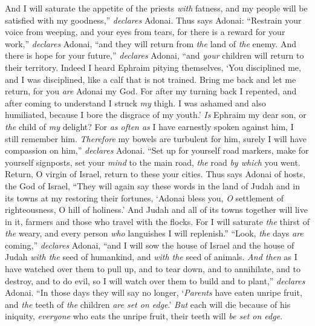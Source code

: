 \begin{biblechapter}
\verse And I will saturate the appetite of the priests \textit{with} fatness, 
and my people will be satisfied with my goodness,” \textit{declares} Adonai.
\verse Thus says Adonai:
\verse “Restrain your voice from weeping, 
and your eyes from tears, 
for there is a reward for your work,” \textit{declares} Adonai, 
“and they will return from \textit{the} land of \textit{the} enemy.
\verse And there is hope for your future,” \textit{declares} Adonai, 
“and \textit{your} children will return to their territory.
\verse Indeed I heard Ephraim pitying themselves, 
‘You disciplined me, and I was disciplined, 
like a calf that is not trained. 
Bring me back and let me return, 
for you \textit{are} Adonai my God.
\verse For after my turning back I repented, 
and after coming to understand I struck \textit{my} thigh. 
I was ashamed and also humiliated, 
because I bore the disgrace of my youth.’
\verse \textit{Is} Ephraim my dear son, 
or \textit{the} child of \textit{my} delight? 
For \textit{as often as} I have earnestly spoken against him, 
I still remember him. 
\textit{Therefore} my bowels are turbulent for him, 
surely I will have compassion on him,” \textit{declares} Adonai.
\verse “Set up for yourself road markers, 
make for yourself signposts, 
set your \textit{mind} to the main road, 
\textit{the} road \textit{by which} you went. 
Return, O virgin of Israel, 
return to these your cities.
\verse Thus says Adonai of hosts, the God of Israel, “They will again say these words in the land of Judah and in its towns at my restoring their fortunes,
\verse ‘Adonai bless you, \textit{O} settlement of righteousness, 
O hill of holiness.’
\verse And Judah and all of its towns together will live in it, 
farmers and those who travel with the flocks.
\verse For I will saturate \textit{the} thirst of \textit{the} weary, 
and every person \textit{who} languishes I will replenish.”
 “Look, \textit{the} days \textit{are} coming,” \textit{declares} Adonai, “and I will sow the house of Israel and the house of Judah \textit{with the} seed of humankind, and \textit{with the} seed of animals.
\verse \textit{And then} as I have watched over them to pull up, and to tear down, and to annihilate, and to destroy, and to do evil, so I will watch over them to build and to plant,” \textit{declares} Adonai.
\verse “In those days they will say no longer, ‘\textit{Parents} have eaten unripe fruit, and \textit{the} teeth of \textit{the} children \textit{are set on edge}.’
\verse \textit{But} each will die because of his iniquity, \textit{everyone} who eats the unripe fruit, their teeth will \textit{be set on edge}.

\end{biblechapter}
